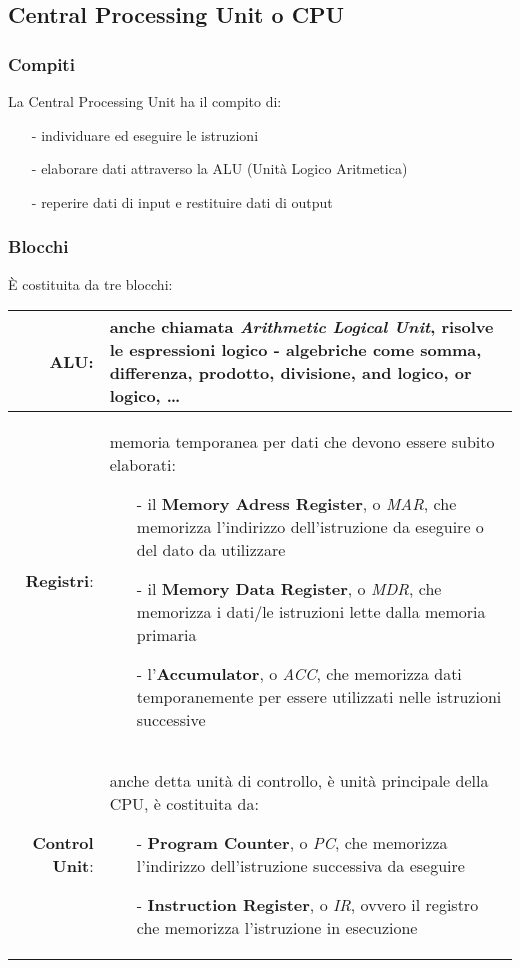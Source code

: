 \documentclass{article}
\begin{document}
\subsection{Central Processing Unit o CPU}
\subsubsection*{Compiti}
La Central Processing Unit ha il compito di:
\begin{itemize}[topsep=5pt, itemsep=0pt]
	\item[-] individuare ed eseguire le istruzioni
	\item[-] elaborare dati attraverso la ALU (Unità Logico Aritmetica)
	\item[-] reperire dati di input e restituire dati di output
\end{itemize}

\subsubsection*{Blocchi}
È costituita da tre blocchi:
\begin{center}	
	\begin{tabularx}{\textwidth}{r X}
		\textbf{ALU}: & anche chiamata \textit{Arithmetic Logical Unit}, risolve le espressioni logico - algebriche come somma,
		differenza, prodotto, divisione, and logico, or logico, \dots \\
		\midrule
		\textbf{Registri}: & memoria temporanea per dati che devono essere subito elaborati:
		\begin{itemize}[topsep=3pt, itemsep=0pt]
			\item[-] il \textbf{Memory Adress Register}, o \textit{MAR}, che memorizza l'indirizzo dell'istruzione da eseguire o del dato da utilizzare
			\item[-] il \textbf{Memory Data Register},	o \textit{MDR}, che memorizza i dati/le istruzioni lette dalla memoria primaria
			\item[-] l'\textbf{Accumulator}, o \textit{ACC}, che memorizza dati temporanemente per essere utilizzati nelle istruzioni successive
		\end{itemize} \\
		\midrule
		\textbf{Control Unit}: & anche detta unità di controllo, è unità principale della CPU, è costituita da:
		\begin{itemize}[topsep=3pt, itemsep=0pt]
			\item[-] \textbf{Program Counter}, o \textit{PC}, che memorizza l'indirizzo dell'istruzione successiva da eseguire
			\item[-] \textbf{Instruction Register}, o \textit{IR}, ovvero il registro che memorizza l'istruzione in esecuzione
		\end{itemize}
	\end{tabularx}
\end{center}
\end{document}

